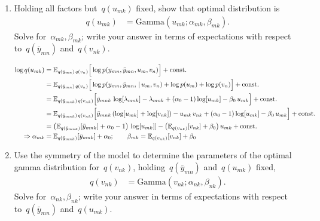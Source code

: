 \begin{enumerate}[label=(\alph*)]
\item Holding all factors but~$q(u_{mk})$ fixed, show that optimal distribution is
\begin{align*}
    q(u_{mk}) 
    &= \mathrm{Gamma}(u_{mk}; \alpha_{mk}, \beta_{mk}).
\end{align*}
Solve for~$\alpha_{mk}, \beta_{mk}$; write your answer in terms of expectations with respect to~$q(\bar{y}_{mn})$ and~$q(v_{nk})$.

\begin{solution}
\begin{align*}
    \log q(u_{mk})
        &= \mathbb{E}_{q(\bar{y}_{mn})\,q(v_n)} \Big[
            \log p(y_{mn}, \bar{y}_{mn}, u_m, v_n)
            \Big] + \textrm{const.}\\
        &= \mathbb{E}_{q(\bar{y}_{mn})\,q(v_n)} \Big[
            \log p(y_{mn}, \bar{y}_{mn}, \,|\, u_m, v_n)
            + \log p(u_m) + \log p(v_n)
            \Big] + \textrm{const.}\\
        &= \mathbb{E}_{q(\bar{y}_{mnk})\,q(v_{nk})} \Big[
            \bar{y}_{mnk}\,\log[\lambda_{mnk}] - \lambda_{mnk}
            +(\alpha_0-1) \log[u_{mk}] - \beta_0\,u_{mk}
            \Big] + \textrm{const.}\\
        &= \mathbb{E}_{q(\bar{y}_{mnk})\,q(v_{nk})} \Big[
            \bar{y}_{mnk}\,(\log[u_{mk}]+\log[v_{nk}]) - u_{mk}\,v_{nk}
            +(\alpha_0-1) \log[u_{mk}] - \beta_0\,u_{mk}
            \Big] + \textrm{const.} \\
        &= \big(\mathbb{E}_{q(\bar{y}_{mnk})}[\bar{y}_{mnk}]
                        +\alpha_0-1\big)\, \log[u_{mk}]]
            - \big(\mathbb{E}_{q(v_{nk})}[v_{nk}] + \beta_0\big)\,u_{mk}
            + \textrm{const.} \\
    \Rightarrow \alpha_{mk}
        &= \mathbb{E}_{q(\bar{y}_{mnk})}[\bar{y}_{mnk}] + \alpha_0;
    \qquad \beta_{mk}
        = \mathbb{E}_{q(v_{nk})}[v_{nk}] + \beta_0
\end{align*}
\end{solution}

\item Use the symmetry of the model to determine the parameters of the optimal gamma distribution for~$q(v_{nk})$, holding~$q(\bar{y}_{mn})$ and~$q(u_{mk})$ fixed,
\begin{align*}
    q(v_{nk}) &= \mathrm{Gamma}(v_{nk}; \alpha_{nk}, \beta_{nk}).
\end{align*}
Solve for~$\alpha_{nk}, \beta_{nk}$; write your answer in terms of expectations with respect to~$q(\bar{y}_{mn})$ and~$q(u_{mk})$.


\end{enumerate}
